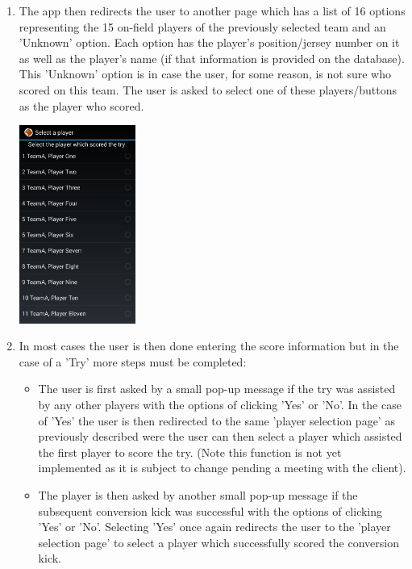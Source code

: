 \documentclass[hidelinks,a4paper,12pt]{article}
\begin{document}
\begin{enumerate}
\begin{center}
		\end{center}
			\item The app then redirects the user to another page which has a list of 16 options representing the 15 on-field players of the previously selected team and an 'Unknown' option. Each option has the player's position/jersey number on it as well as the player's name (if that information is provided on the database). This 'Unknown' option is in case the user, for some reason, is not sure who scored on this team. The user is asked to select one of these players/buttons as the player who scored.
		\begin{center}
  			 \includegraphics[width=0.3\textwidth] {./images/choose_try_player.png}\\[0.4cm]
		\end{center}
			\item In most cases the user is then done entering the score information but in the case of a 'Try' more steps must be completed:
				\begin{itemize}
					\item The user is first asked by a small pop-up message if the try was assisted by any other players with the options of clicking 'Yes' or 'No'. In the case of 'Yes' the user is then redirected to the same 'player selection page' as previously described were the user can then select a player which assisted the first player to score the try. (Note this function is not yet implemented as it is subject to change pending a meeting with the client).
					\item The player is then asked by another small pop-up message if the subsequent conversion kick was successful with the options of clicking 'Yes' or 'No'. Selecting 'Yes' once again redirects the user to the 'player selection page' to select a player which successfully scored the conversion kick.
				\begin{center}

\end{center}
\end{itemize}
\end{enumerate}
\end{document}

